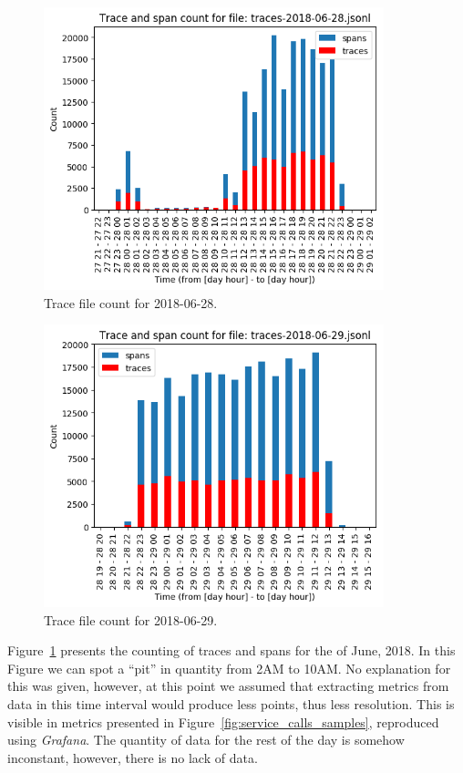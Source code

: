\begin{figure}[H]
    \centering
    \includegraphics[width=0.88\textwidth]{images/trace_file_count_2018_06_28_chart.png}
    \caption{Trace file count for 2018-06-28.}
    \label{fig:trace_file_count_2018_06_28}
\end{figure}

\begin{figure}[H]
    \centering
    \includegraphics[width=0.88\textwidth]{images/trace_file_count_2018_06_29_chart.png}
    \caption{Trace file count for 2018-06-29.}
    \label{fig:trace_file_count_2018_06_29}
\end{figure}

Figure~\ref{fig:trace_file_count_2018_06_28} presents the counting of traces and spans for the  of June, 2018. In this Figure we can spot a ``pit'' in quantity from 2AM to 10AM. No explanation for this was given, however, at this point we assumed that extracting metrics from data in this time interval would produce less points, thus less resolution. This is visible in metrics presented in Figure~\ref{fig:service_calls_samples}, reproduced using \emph{Grafana}. The quantity of data for the rest of the day is somehow inconstant, however, there is no lack of data.


